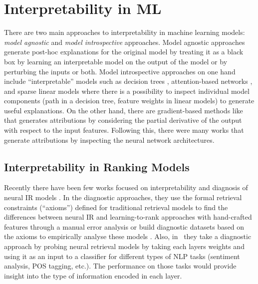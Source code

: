 

\section{Interpretability in ML}
\label{sec:interpretability_ml}

There are two main approaches to interpretability in machine learning models: {\it model agnostic} and {\it model introspective} approaches. Model agnostic approaches \citep{Ribeiro16, Ribeiro18} generate post-hoc explanations for the original model by treating it as a black box by learning an interpretable model on the output of the model or by perturbing the inputs or both. Model introspective approaches on one hand include ``interpretable'' models such as decision trees \citep{letham2015}, attention-based networks \citep{Xu2015}, and sparse linear models \citep{Ustun2016} where there is a possibility to inspect individual model components (path in a decision tree, feature weights in linear models) to generate useful explanations. On the other hand, there are gradient-based methods like \cite{Simonyan2013DeepIC} that generates attributions by considering the partial derivative of the output with respect to the input features. Following this, there were many works \citep{Lundberg17, ShrikumarGK17, Bach15, Arras17} that generate attributions by inspecting the neural network architectures.  

\subsection{Interpretability in Ranking Models}
\label{sec:interpretability_in_ir}

Recently there have been few works focused on interpretability \citep{Singh19} and diagnosis of neural IR models \citep{Rennings19, PangLG0C17, Cohen18}. In the diagnostic approaches, they use the formal retrieval constraints (``axioms'') defined for traditional retrieval models to find the differences between neural IR and learning-to-rank approaches with hand-crafted features through a manual error analysis \citep{PangLG0C17} or build diagnostic datasets based on the axioms to empirically analyse these models \citep{Rennings19}. Also, in~\cite{Cohen18} they take a diagnostic approach by probing neural retrieval models by taking each layers weights and using it as an input to a classifier for different types of NLP tasks (sentiment analysis, POS tagging, etc.). The performance on those tasks would provide insight into the type of information encoded in each layer. 

